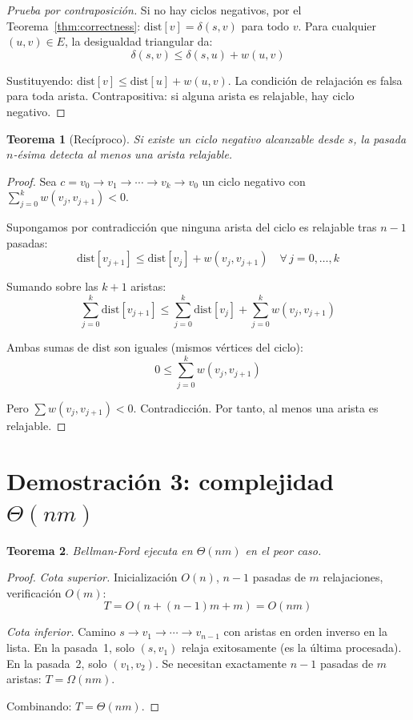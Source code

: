\documentclass[11pt, letterpaper]{article}
\theoremstyle{definition}
\theoremstyle{plain}
\newtheorem{theorem}{Teorema}[section]
\theoremstyle{remark}
\begin{document}
\begin{proof}[Prueba por contraposición]
Si no hay ciclos negativos, por el Teorema~\ref{thm:correctness}:
$\mathrm{dist}[v] = \delta(s,v)$ para todo $v$. Para cualquier
$(u,v) \in E$, la desigualdad triangular da:
\[
  \delta(s,v) \leq \delta(s,u) + w(u,v)
\]

Sustituyendo:
$\mathrm{dist}[v] \leq \mathrm{dist}[u] + w(u,v)$. La condición
de relajación es falsa para toda arista. Contrapositiva: si alguna
arista es relajable, hay ciclo negativo.
\end{proof}

\begin{theorem}[Recíproco]\label{thm:negcycle-conv}
Si existe un ciclo negativo alcanzable desde $s$, la pasada
$n$-ésima detecta al menos una arista relajable.
\end{theorem}

\begin{proof}
Sea $c = v_0 \to v_1 \to \cdots \to v_k \to v_0$ un ciclo negativo
con $\sum_{j=0}^{k} w(v_j, v_{j+1}) < 0$.

Supongamos por contradicción que ninguna arista del ciclo es
relajable tras $n - 1$ pasadas:
\[
  \mathrm{dist}[v_{j+1}] \leq \mathrm{dist}[v_j] + w(v_j, v_{j+1})
  \quad \forall\, j = 0, \ldots, k
\]

Sumando sobre las $k + 1$ aristas:
\[
  \sum_{j=0}^{k} \mathrm{dist}[v_{j+1}]
  \leq \sum_{j=0}^{k} \mathrm{dist}[v_j]
  + \sum_{j=0}^{k} w(v_j, v_{j+1})
\]

Ambas sumas de $\mathrm{dist}$ son iguales (mismos vértices del
ciclo):
\[
  0 \leq \sum_{j=0}^{k} w(v_j, v_{j+1})
\]

Pero $\sum w(v_j, v_{j+1}) < 0$. Contradicción. Por tanto, al menos
una arista es relajable.
\end{proof}

\section{Demostración 3: complejidad
  \texorpdfstring{$\Theta(nm)$}{Theta(nm)}}

\begin{theorem}\label{thm:complexity}
Bellman-Ford ejecuta en $\Theta(nm)$ en el peor caso.
\end{theorem}

\begin{proof}
\emph{Cota superior.} Inicialización $O(n)$, $n - 1$ pasadas de
$m$ relajaciones, verificación $O(m)$:
\[
  T = O(n + (n{-}1)m + m) = O(nm)
\]

\emph{Cota inferior.} Camino
$s \to v_1 \to \cdots \to v_{n-1}$ con aristas en orden inverso en
la lista. En la pasada~1, solo $(s,v_1)$ relaja exitosamente (es la
última procesada). En la pasada~2, solo $(v_1,v_2)$. Se necesitan
exactamente $n - 1$ pasadas de $m$ aristas:
$T = \Omega(nm)$.

Combinando: $T = \Theta(nm)$.
\end{proof}
\end{document}

